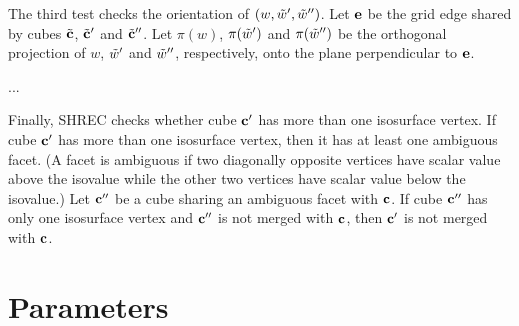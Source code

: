 The third test checks the orientation of $(w, \tilde{w}', \tilde{w}'')$.
Let $\mathbf{e}$ be the grid edge shared by cubes ${\tilde{\mathbf{c}}}$, ${\tilde{\mathbf{c}}}'$ and ${\tilde{\mathbf{c}}}''$.
Let $\pi(w)$, $\pi(\tilde{w}')$ and $\pi(\tilde{w}'')$ be the orthogonal projection
of $w$, $\tilde{w}'$ and $\tilde{w}''$, respectively, 
onto the plane perpendicular to $\mathbf{e}$.


...











Finally, SHREC checks whether cube $\mathbf{c}'$ has more than one isosurface vertex.
If cube $\mathbf{c}'$ has more than one isosurface vertex,
then it has at least one ambiguous facet.
(A facet is ambiguous if two diagonally opposite vertices have
scalar value above the isovalue while the other two vertices
have scalar value below the isovalue.)
Let $\mathbf{c}''$ be a cube sharing an ambiguous facet with $\mathbf{c}$.
If cube $\mathbf{c}''$ has only one isosurface vertex and 
$\mathbf{c}''$ is not merged with $\mathbf{c}$, then $\mathbf{c}'$ is not merged with $\mathbf{c}$.





\section{Parameters}
\label{section:parameters}

